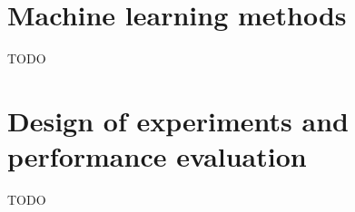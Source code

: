 \documentclass[a4paper]{article}
\begin{document}
\section{Machine learning methods}

TODO

\section{Design of experiments and performance evaluation}

TODO



%
\end{document}
